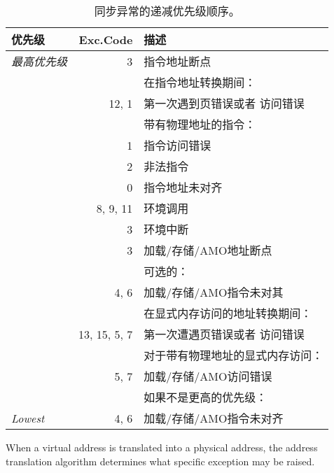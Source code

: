 \begin{table*}[htbp]
\begin{center}
\begin{tabular}{|l|r|l|}

  \hline
  优先级      & Exc.\@ Code & 描述 \\
  \hline
  {\em 最高优先级} &          3 & 指令地址断点 \\
  \hline
                &            & 在指令地址转换期间： \\
                &      12, 1 & \quad 第一次遇到页错误或者
                                  访问错误 \\
  \hline
                &            & 带有物理地址的指令： \\
                &          1 & \quad 指令访问错误 \\
  \hline
                &          2 & 非法指令 \\
                &          0 & 指令地址未对齐 \\
                &   8, 9, 11 & 环境调用 \\
                &          3 & 环境中断 \\
                &          3 & 加载/存储/AMO地址断点 \\
  \hline
                &            & 可选的： \\
                &       4, 6 & \quad 加载/存储/AMO指令未对其 \\
  \hline
                &            & 在显式内存访问的地址转换期间： \\
              & 13, 15, 5, 7 & \quad 第一次遭遇页错误或者
                                  访问错误 \\
  \hline
                &            &  对于带有物理地址的显式内存访问： \\
                &       5, 7 & \quad 加载/存储/AMO访问错误 \\
  \hline
                &            & 如果不是更高的优先级： \\
  {\em Lowest}  &       4, 6 & \quad 加载/存储/AMO指令未对齐 \\
  \hline

\end{tabular}
\end{center}
\caption{同步异常的递减优先级顺序。}
\label{exception-priority}
\end{table*}

\iffalse
When a virtual address is translated into
a physical address, the address translation
algorithm determines what specific exception may be raised.

